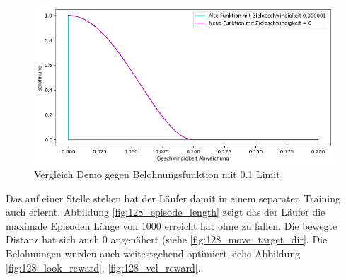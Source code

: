 \begin{figure}[H]
  \centering  
  \includegraphics[scale=0.5]{img/match_velocity_vergleich_clip.png}
  \caption{Vergleich Demo gegen Belohnungsfunktion mit 0.1 Limit}
  \label{fig:match_velocity_vergleich_clip}
\end{figure}
Das auf einer Stelle stehen hat der Läufer damit in einem separaten Training auch erlernt. Abbildung \ref{fig:128_episode_length} zeigt das der Läufer die maximale Episoden Länge von 1000 erreicht hat ohne zu fallen. Die bewegte Distanz hat sich auch 0 angenähert (siehe \ref{fig:128_move_target_dir}. Die Belohnungen wurden auch weitestgehend optimiert siehe Abbildung \ref{fig:128_look_reward}, \ref{fig:128_vel_reward}.


